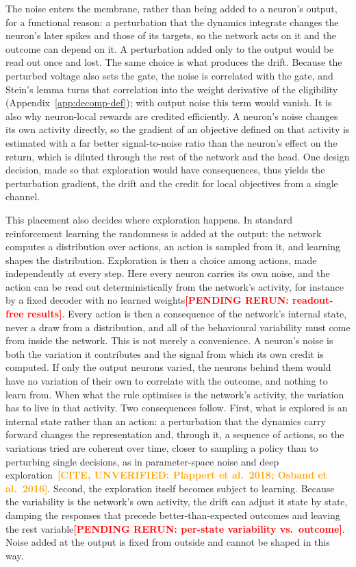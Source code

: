 \documentclass[10pt,twocolumn]{article}
\newcommand{\pending}[1]{\textcolor{red}{\bfseries[PENDING RERUN#1]}}
\newcommand{\unverified}[1]{\textcolor{orange}{\bfseries[CITE, UNVERIFIED: #1]}}
\begin{document}
The noise enters the membrane, rather than being added to a neuron's output, for a
functional reason: a perturbation that the dynamics integrate changes the neuron's later
spikes and those of its targets, so the network acts on it and the outcome can depend on
it. A perturbation added only to the output would be read out once and lost. The same
choice is what produces the drift. Because the perturbed voltage also sets the gate, the
noise is correlated with the gate, and Stein's lemma turns that correlation into the
weight derivative of the eligibility (Appendix~\ref{app:decomp-def}); with output noise
this term would vanish. It is also why neuron-local rewards are credited efficiently. A
neuron's noise changes its own activity directly, so the gradient of an objective defined
on that activity is estimated with a far better signal-to-noise ratio than the neuron's
effect on the return, which is diluted through the rest of the network and the head. One
design decision, made so that exploration would have consequences, thus yields the
perturbation gradient, the drift and the credit for local objectives from a single
channel.

This placement also decides where exploration happens. In standard reinforcement learning
the randomness is added at the output: the network computes a distribution over actions, an
action is sampled from it, and learning shapes the distribution. Exploration is then a choice
among actions, made independently at every step. Here every neuron carries its own noise, and
the action can be read out deterministically from the network's activity, for instance by a
fixed decoder with no learned weights\pending{: readout-free results}. Every action is then a
consequence of the network's internal state, never a draw from a distribution, and all of the
behavioural variability must come from inside the network. This is not merely a convenience. A
neuron's noise is both the variation it contributes and the signal from which its own credit is
computed. If only the output neurons varied, the neurons behind them would have no variation of
their own to correlate with the outcome, and nothing to learn from. When what the rule optimises
is the network's activity, the variation has to live in that activity. Two consequences follow.
First, what is explored is an internal state rather than an action: a perturbation that the
dynamics carry forward changes the representation and, through it, a sequence of actions, so
the variations tried are coherent over time, closer to sampling a policy than to perturbing
single decisions, as in parameter-space noise and deep exploration~\unverified{Plappert et
al.\ 2018; Osband et al.\ 2016}. Second, the exploration itself becomes subject to learning.
Because the variability is the network's own activity, the drift can adjust it state by state,
damping the responses that precede better-than-expected outcomes and leaving the rest
variable\pending{: per-state variability vs.\ outcome}. Noise added at the output is fixed from
outside and cannot be shaped in this way.
\end{document}
